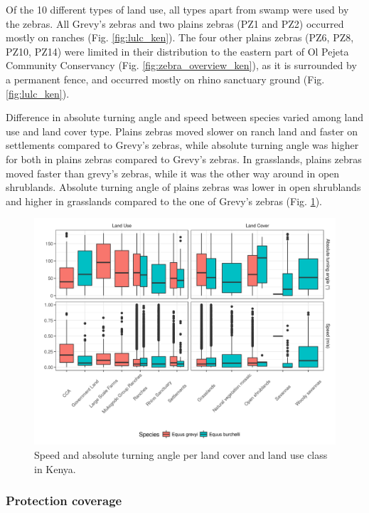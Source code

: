 \documentclass[12pt,a4paper, twoside, english]{article}
\begin{document}
Of the 10 different types of land use, all types apart from swamp were used by the zebras. All Grevy's zebras and two plains zebras (PZ1 and PZ2) occurred mostly on ranches (Fig. \ref{fig:lulc_ken}). The four other plains zebras (PZ6, PZ8, PZ10, PZ14) were limited in their distribution to the eastern part of Ol Pejeta Community Conservancy (Fig. \ref{fig:zebra_overview_ken}), as it is surrounded by a permanent fence, and occurred mostly on rhino sanctuary ground (Fig. \ref{fig:lulc_ken}). 

Difference in absolute turning angle and speed between species varied among land use and land cover type. Plains zebras moved slower on ranch land and faster on settlements compared to Grevy's zebras, while absolute turning angle was higher for both in plains zebras compared to Grevy's zebras. In grasslands, plains zebras moved faster than grevy's zebras, while it was the other way around in open shrublands. Absolute turning angle of plains zebras was lower in open shrublands and higher in grasslands compared to the one of Grevy's zebras (Fig. \ref{fig:lulc_angle_speed_KEN}).

\begin{figure}[H]
  \centering
  \includegraphics[width=\textwidth]{figures/LULC_angle_speed_KEN.png}
  \caption[Speed and turning angle per LU and LC class]{Speed and absolute turning angle per land cover and land use class in Kenya.}
  \label{fig:lulc_angle_speed_KEN}
\end{figure}

\subsubsection{Protection coverage}
\end{document}
